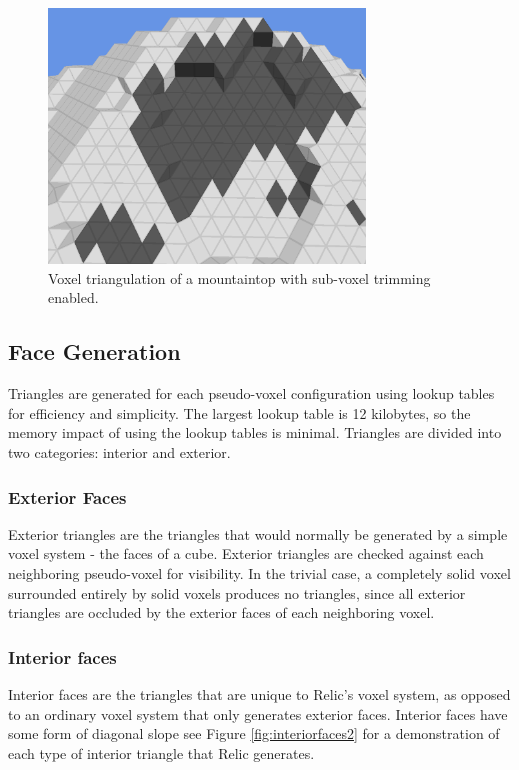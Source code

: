 \begin{figure}
	\centering
		\includegraphics[width=0.75\textwidth]{figures/trimcomparison2.png}
	\caption{
		Voxel triangulation of a mountaintop with sub-voxel trimming enabled.
	}
	\label{fig:trimcomparison2}
\end{figure}

\subsection{Face Generation}

Triangles are generated for each pseudo-voxel configuration using lookup tables for efficiency and simplicity.
The largest lookup table is 12 kilobytes, so the memory impact of using the lookup tables is minimal.
Triangles are divided into two categories: interior and exterior.

\subsubsection{Exterior Faces}

Exterior triangles are the triangles that would normally be generated by a simple voxel system - the faces of a cube.
Exterior triangles are checked against each neighboring pseudo-voxel for visibility.
In the trivial case, a completely solid voxel surrounded entirely by solid voxels produces no triangles, since all exterior triangles are occluded by the exterior faces of each neighboring voxel.

\subsubsection{Interior faces}

Interior faces are the triangles that are unique to Relic's voxel system, as opposed to an ordinary voxel system that only generates exterior faces.
Interior faces have some form of diagonal slope see Figure \ref{fig:interiorfaces2} for a demonstration of each type of interior triangle that Relic generates.

